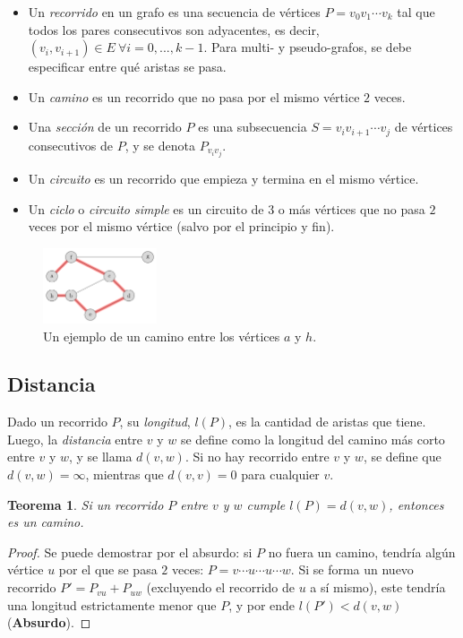 \documentclass[a4paper]{report}
\newtheorem*{theorem*}{Teorema}
\begin{document}
\begin{itemize}
    \item Un \textit{recorrido} en un grafo es una secuencia de vértices $P = v_0 v_1 \cdots v_k$ tal que todos los pares consecutivos son adyacentes, es decir, $(v_i, v_{i+1}) \in E\ \forall i = 0, ..., k - 1$. Para multi- y pseudo-grafos, se debe especificar entre qué aristas se pasa.
    \item Un \textit{camino} es un recorrido que no pasa por el mismo vértice $2$ veces.
    \item Una \textit{sección} de un recorrido $P$ es una subsecuencia $S = v_i v_{i+1} \cdots v_j$ de vértices consecutivos de $P$, y se denota $P_{v_i v_j}$.
    \item Un \textit{circuito} es un recorrido que empieza y termina en el mismo vértice.
    \item Un \textit{ciclo} o \textit{circuito simple} es un circuito de $3$ o más vértices que no pasa $2$ veces por el mismo vértice (salvo por el principio y fin).
\end{itemize}

\begin{figure}[H]
    \centering
    \includegraphics[width=0.3\textwidth]{ejemplo_camino.png}
    \caption*{Un ejemplo de un camino entre los vértices $a$ y $h$.}
\end{figure}

\subsection{Distancia}

Dado un recorrido $P$, su \textit{longitud}, $l(P)$, es la cantidad de aristas que tiene. Luego, la \textit{distancia} entre $v$ y $w$ se define como la longitud del camino más corto entre $v$ y $w$, y se llama $d(v, w)$. Si no hay recorrido entre $v$ y $w$, se define que $d(v, w) = \infty$, mientras que $d(v, v) = 0$ para cualquier $v$.

\begin{theorem*}
    Si un recorrido $P$ entre $v$ y $w$ cumple $l(P) = d(v, w)$, entonces es un camino.
\end{theorem*}
\begin{proof}
    Se puede demostrar por el absurdo: si $P$ no fuera un camino, tendría algún vértice $u$ por el que se pasa $2$ veces: $P = v \cdots u \cdots u \cdots w$. Si se forma un nuevo recorrido $P' = P_{vu} + P_{uw}$ (excluyendo el recorrido de $u$ a sí mismo), este tendría una longitud estrictamente menor que $P$, y por ende $l(P') < d(v, w)$ (\textbf{Absurdo}).

\end{proof}
\end{document}
